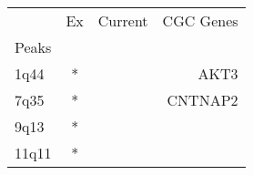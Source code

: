 \begin{tabular}{lccr}
\toprule
{} & Ex & Current & CGC Genes \\
Peaks &    &         &           \\
\midrule
1q44  &  * &         &      AKT3 \\
7q35  &  * &         &   CNTNAP2 \\
9q13  &  * &         &           \\
11q11 &  * &         &           \\
\bottomrule
\end{tabular}
